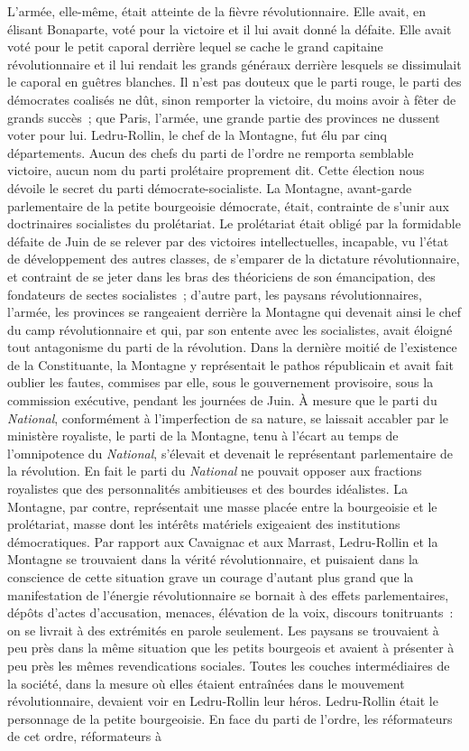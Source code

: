 \documentclass[french,twoside]{book} %
\begin{document}
L’armée, elle-même, était atteinte de la fièvre révolutionnaire. Elle avait, en élisant Bonaparte, voté pour la victoire et il lui avait donné la défaite. Elle avait voté pour le petit caporal derrière lequel se cache le grand capitaine révolutionnaire et il lui rendait les grands généraux derrière lesquels se dissimulait le caporal en guêtres blanches. Il n’est pas douteux que le parti rouge, le parti des démocrates coalisés ne dût, sinon remporter la victoire, du moins avoir à fêter de grands succès ; que Paris, l’armée, une grande partie des provinces ne dussent voter pour lui. Ledru-Rollin, le chef de la Montagne, fut élu par cinq départements. Aucun des chefs du parti de l’ordre ne remporta semblable victoire, aucun nom du parti prolétaire proprement dit. Cette élection nous dévoile le secret du parti démocrate-socialiste. La Montagne, avant-garde parlementaire de la petite bourgeoisie démocrate, était, contrainte de s’unir aux doctrinaires socialistes du prolétariat. Le prolétariat était obligé par la formidable défaite de Juin de se relever par des victoires intellectuelles, incapable, vu l’état de développement des autres classes, de s’emparer de la dictature révolutionnaire, et contraint de se jeter dans les bras des théoriciens de son émancipation, des fondateurs de sectes socialistes ; d’autre part, les paysans révolutionnaires, l’armée, les provinces se rangeaient derrière la Montagne qui devenait ainsi le chef du camp révolutionnaire et qui, par son entente avec les socialistes, avait éloigné tout antagonisme du parti de la révolution. Dans la dernière moitié de l’existence de la Constituante, la Montagne y représentait le pathos républicain et avait fait oublier les fautes, commises par elle, sous le gouvernement provisoire, sous la commission exécutive, pendant les journées de Juin. À mesure que le parti du \emph{National}, conformément à l’imperfection de sa nature, se laissait accabler par le ministère royaliste, le parti de la Montagne, tenu à l’écart au temps de l’omnipotence du \emph{National}, s’élevait et devenait le représentant parlementaire de la révolution. En fait le parti du \emph{National} ne pouvait opposer aux fractions royalistes que des personnalités ambitieuses et des bourdes idéalistes. La Montagne, par contre, représentait une masse placée entre la bourgeoisie et le prolétariat, masse dont les intérêts matériels exigeaient des institutions démocratiques. Par rapport aux Cavaignac et aux Marrast, Ledru-Rollin et la Montagne se trouvaient dans la vérité révolutionnaire, et puisaient dans la conscience de cette situation grave un courage d’autant plus grand que la manifestation de l’énergie révolutionnaire se bornait à des effets parlementaires, dépôts d’actes d’accusation, menaces, élévation de la voix, discours tonitruants : on se livrait à des extrémités en parole seulement. Les paysans se trouvaient à peu près dans la même situation que les petits bourgeois et avaient à présenter à peu près les mêmes revendications sociales. Toutes les couches intermédiaires de la société, dans la mesure où elles étaient entraînées dans le mouvement révolutionnaire, devaient voir en Ledru-Rollin leur héros. Ledru-Rollin était le personnage de la petite bourgeoisie. En face du parti de l’ordre, les réformateurs de cet ordre, réformateurs à 
\end{document}
